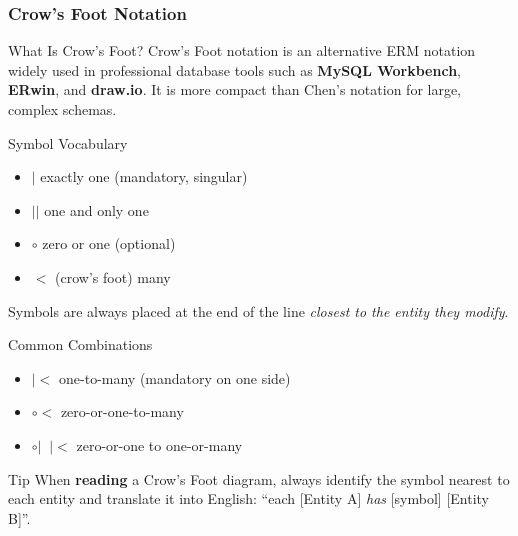 \begin{frame}
  \frametitle{Crow's Foot Notation}

  \begin{block}{What Is Crow's Foot?}
    Crow's Foot notation is an alternative ERM notation widely used in professional database tools such as \textbf{MySQL Workbench}, \textbf{ERwin}, and \textbf{draw.io}. It is more compact than Chen's notation for large, complex schemas.
  \end{block}

  \begin{block}{Symbol Vocabulary}
    \begin{itemize}
      \item $|$ \quad exactly one (mandatory, singular)
      \item $||$ \quad one and only one
      \item $\circ$ \quad zero or one (optional)
      \item $<$ (crow's foot) \quad many
    \end{itemize}
    Symbols are always placed at the end of the line \textit{closest to the entity they modify}.
  \end{block}

  \begin{block}{Common Combinations}
    \begin{itemize}
      \item $|\!<$ \quad one-to-many (mandatory on one side)
      \item $\circ\!<$ \quad zero-or-one-to-many
      \item $\circ|\;\;|\!<$ \quad zero-or-one to one-or-many
    \end{itemize}
  \end{block}

  \begin{examples}{Tip}
    When \textbf{reading} a Crow's Foot diagram, always identify the symbol nearest to each entity and translate it into English: ``each [Entity A] \textit{has} [symbol] [Entity B]''.
  \end{examples}
\end{frame}

